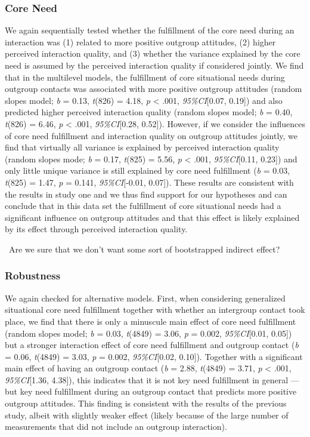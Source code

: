 \subsubsection{Core Need}

We again sequentially tested whether the fulfillment of the core need
during an interaction was (1) related to more positive outgroup
attitudes, (2) higher perceived interaction quality, and (3) whether the
variance explained by the core need is assumed by the perceived
interaction quality if considered jointly. We find that in the
multilevel models, the fulfillment of core situational needs during
outgroup contacts was associated with more positive outgroup attitudes
(random slopes model; \textit{b} = 0.13, \textit{t}(826) = 4.18,
\textit{p} \textless{} .001, \textit{95\%CI}{[}0.07, 0.19{]}) and also
predicted higher perceived interaction quality (random slopes model;
\textit{b} = 0.40, \textit{t}(826) = 6.46, \textit{p} \textless{} .001,
\textit{95\%CI}{[}0.28, 0.52{]}). However, if we consider the influences
of core need fulfillment and interaction quality on outgroup attitudes
jointly, we find that virtually all variance is explained by perceived
interaction quality (random slopes mode; \textit{b} = 0.17,
\textit{t}(825) = 5.56, \textit{p} \textless{} .001,
\textit{95\%CI}{[}0.11, 0.23{]}) and only little unique variance is
still explained by core need fulfillment (\textit{b} = 0.03,
\textit{t}(825) = 1.47, \textit{p} = 0.141, \textit{95\%CI}{[}-0.01,
0.07{]}). These results are consistent with the results in study one and
we thus find support for our hypotheses and can conclude that in this
data set the fulfillment of core situational needs had a significant
influence on outgroup attitudes and that this effect is likely explained
by its effect through perceived interaction quality.

\faQuestionCircle~Are we sure that we don't want some sort of
bootstrapped indirect effect?

\subsubsection{Robustness}

We again checked for alternative models. First, when considering
generalized situational core need fulfillment together with whether an
intergroup contact took place, we find that there is only a minuscule
main effect of core need fulfillment (random slopes model; \textit{b} =
0.03, \textit{t}(4849) = 3.06, \textit{p} = 0.002,
\textit{95\%CI}{[}0.01, 0.05{]}) but a stronger interaction effect of
core need fulfillment and outgroup contact (\textit{b} = 0.06,
\textit{t}(4849) = 3.03, \textit{p} = 0.002, \textit{95\%CI}{[}0.02,
0.10{]}). Together with a significant main effect of having an outgroup
contact (\textit{b} = 2.88, \textit{t}(4849) = 3.71, \textit{p}
\textless{} .001, \textit{95\%CI}{[}1.36, 4.38{]}), this indicates that
it is not key need fulfillment in general --- but key need fulfillment
during an outgroup contact that predicts more positive outgroup
attitudes. This finding is consistent with the results of the previous
study, albeit with slightly weaker effect (likely because of the large
number of measurements that did not include an outgroup interaction).

